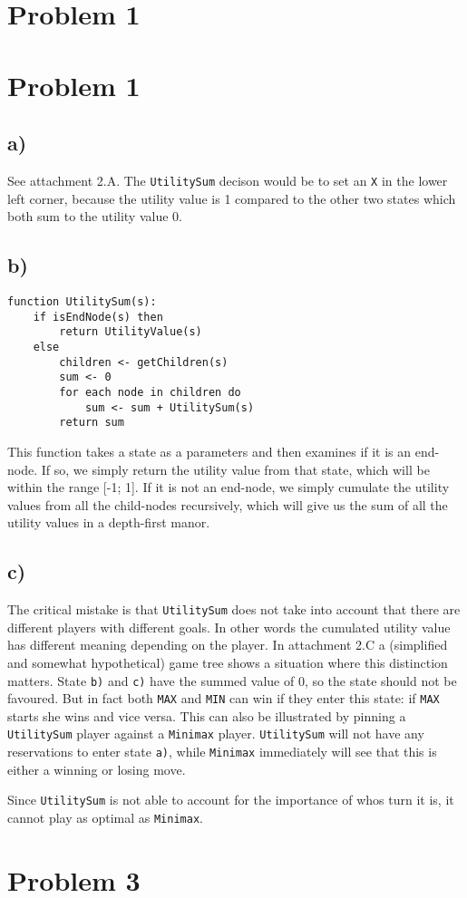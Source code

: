 \documentclass[12pt,a4paper]{article}
\author{Jens Egholm Pedersen}
\begin{document}
\section*{Problem 1}


\section*{Problem 1}

\subsection*{a)}
See attachment 2.A. The \texttt{UtilitySum} decison would be to set an
\texttt{X} in the lower left corner, because the utility value is 1
compared to the other two states which both sum to the utility value 0.

\subsection*{b)}
\begin{lstlisting}[frame=single]
function UtilitySum(s):
    if isEndNode(s) then
        return UtilityValue(s)
    else
        children <- getChildren(s)
        sum <- 0
        for each node in children do
            sum <- sum + UtilitySum(s)
        return sum
\end{lstlisting}
This function takes a state as a parameters and then examines if it is an
end-node. If so, we simply return the utility value from that state, which
will be within the range [-1; 1].
If it is not an end-node, we simply cumulate the utility values from
all the child-nodes recursively, which will give us the sum of all the
utility values in a depth-first manor.

\subsection*{c)}
The critical mistake is that \texttt{UtilitySum} does not take into
account that there are different players with different goals. In
other words the cumulated utility value has different meaning depending
on the player. In attachment 2.C a (simplified and somewhat hypothetical)
game tree shows a
situation where this distinction matters. State \texttt{b)} and \texttt{c)}
have the summed value of 0, so the state should not be favoured. But in fact
both \texttt{MAX} and \texttt{MIN} can win if they enter this state: if
\texttt{MAX} starts she wins and vice versa. This can also be illustrated
by pinning a \texttt{UtilitySum} player against a \texttt{Minimax} player.
\texttt{UtilitySum} will not have any reservations to enter state \texttt{a)},
while \texttt{Minimax} immediately will see that this is either a winning
or losing move.

Since \texttt{UtilitySum} is not
able to account for the importance of whos turn it is, it cannot play as
optimal as \texttt{Minimax}.

\section*{Problem 3}
\end{document}

